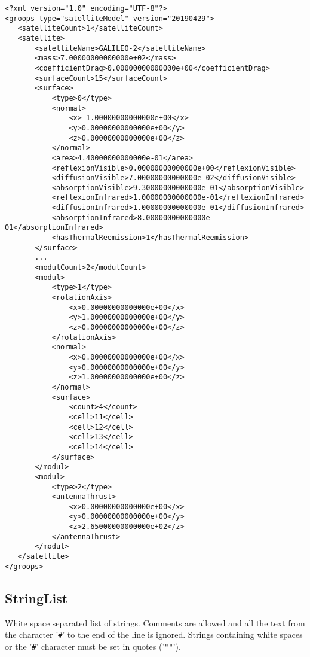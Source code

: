 \begin{verbatim}
<?xml version="1.0" encoding="UTF-8"?>
<groops type="satelliteModel" version="20190429">
   <satelliteCount>1</satelliteCount>
   <satellite>
       <satelliteName>GALILEO-2</satelliteName>
       <mass>7.00000000000000e+02</mass>
       <coefficientDrag>0.00000000000000e+00</coefficientDrag>
       <surfaceCount>15</surfaceCount>
       <surface>
           <type>0</type>
           <normal>
               <x>-1.00000000000000e+00</x>
               <y>0.00000000000000e+00</y>
               <z>0.00000000000000e+00</z>
           </normal>
           <area>4.40000000000000e-01</area>
           <reflexionVisible>0.00000000000000e+00</reflexionVisible>
           <diffusionVisible>7.00000000000000e-02</diffusionVisible>
           <absorptionVisible>9.30000000000000e-01</absorptionVisible>
           <reflexionInfrared>1.00000000000000e-01</reflexionInfrared>
           <diffusionInfrared>1.00000000000000e-01</diffusionInfrared>
           <absorptionInfrared>8.00000000000000e-01</absorptionInfrared>
           <hasThermalReemission>1</hasThermalReemission>
       </surface>
       ...
       <modulCount>2</modulCount>
       <modul>
           <type>1</type>
           <rotationAxis>
               <x>0.00000000000000e+00</x>
               <y>1.00000000000000e+00</y>
               <z>0.00000000000000e+00</z>
           </rotationAxis>
           <normal>
               <x>0.00000000000000e+00</x>
               <y>0.00000000000000e+00</y>
               <z>1.00000000000000e+00</z>
           </normal>
           <surface>
               <count>4</count>
               <cell>11</cell>
               <cell>12</cell>
               <cell>13</cell>
               <cell>14</cell>
           </surface>
       </modul>
       <modul>
           <type>2</type>
           <antennaThrust>
               <x>0.00000000000000e+00</x>
               <y>0.00000000000000e+00</y>
               <z>2.65000000000000e+02</z>
           </antennaThrust>
       </modul>
   </satellite>
</groops>
\end{verbatim}


\subsection{StringList}\label{general.fileFormat:stringList}
White space separated list of strings.
Comments are allowed and all the text from the character '\verb|#|' to the end of the line is ignored.
Strings containing white spaces or the '\verb|#|' character must be set in quotes ('\verb|""|').

